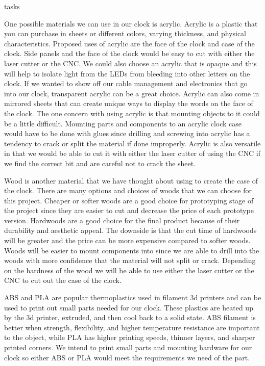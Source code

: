 tasks\documentclass[onecolumn, draftclsnofoot,10pt, compsoc]{IEEEtran}
\begin{document}
One possible materials we can use in our clock is acrylic.
Acrylic is a plastic that you can purchase in sheets or different colors, varying thickness, and physical characteristics.
Proposed uses of acrylic are the face of the clock and case of the clock.
Side panels and the face of the clock would be easy to cut with either the laser cutter or the CNC.
We could also choose an acrylic that is opaque and this will help to isolate light from the LEDs from bleeding into other letters on the clock.
If we wanted to show off our cable management and electronics that go into our clock, transparent acrylic can be a great choice.
Acrylic can also come in mirrored sheets that can create unique ways to display the words on the face of the clock.
The one concern with using acrylic is that mounting objects to it could be a little difficult.
Mounting parts and components to an acrylic clock case would have to be done with glues since drilling and screwing into acrylic has a tendency to crack or split the material if done improperly.
Acrylic is also versatile in that we would be able to cut it with either the laser cutter of using the CNC if we find the correct bit and are careful not to crack the sheet.

Wood is another material that we have thought about using to create the case of the clock.
There are many options and choices of woods that we can choose for this project.
Cheaper or softer woods are a good choice for prototyping stage of the project since they are easier to cut and decrease the price of each prototype version. Hardwoods are a good choice for the final product because of their durability and aesthetic appeal.
The downside is that the cut time of hardwoods will be greater and the price can be more expensive compared to softer woods.
Woods will be easier to mount components into since we are able to drill into the woods with more confidence that the material will not split or crack.
Depending on the hardness of the wood we will be able to use either the laser cutter or the CNC to cut out the case of the clock.

ABS and PLA are popular thermoplastics used in filament 3d printers and can be used to print out small parts needed for our clock.
These plastics are heated up by the 3d printer, extruded, and then cool back to a solid state.
ABS filament is better when strength, flexibility, and higher temperature resistance are important to the object, while PLA has higher printing speeds, thinner layers, and sharper printed corners.
We intend to print small parts and mounting hardware for our clock so either ABS or PLA would meet the requirements we need of the part.
\end{document}
